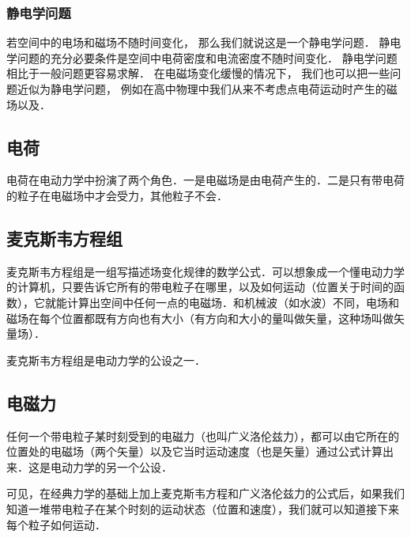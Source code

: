 \subsubsection{静电学问题}
若空间中的电场和磁场不随时间变化， 那么我们就说这是一个静电学问题． 静电学问题的充分必要条件是空间中电荷密度和电流密度不随时间变化． 静电学问题相比于一般问题更容易求解． 在电磁场变化缓慢的情况下， 我们也可以把一些问题近似为静电学问题， 例如在高中物理中我们从来不考虑点电荷运动时产生的磁场以及．

\subsection{电荷}
电荷在电动力学中扮演了两个角色．一是电磁场是由电荷产生的．二是只有带电荷的粒子在电磁场中才会受力，其他粒子不会．

\subsection{麦克斯韦方程组}
麦克斯韦方程组是一组写描述场变化规律的数学公式．可以想象成一个懂电动力学的计算机，只要告诉它所有的带电粒子在哪里，以及如何运动（位置关于时间的函数），它就能计算出空间中任何一点的电磁场．和机械波（如水波）不同，电场和磁场在每个位置都既有方向也有大小（有方向和大小的量叫做矢量，这种场叫做矢量场）．

麦克斯韦方程组是电动力学的公设之一．

\subsection{电磁力}
任何一个带电粒子某时刻受到的电磁力（也叫广义洛伦兹力），都可以由它所在的位置处的电磁场（两个矢量）以及它当时运动速度（也是矢量）通过公式计算出来．这是电动力学的另一个公设．

可见，在经典力学的基础上加上麦克斯韦方程和广义洛伦兹力的公式后，如果我们知道一堆带电粒子在某个时刻的运动状态（位置和速度），我们就可以知道接下来每个粒子如何运动．
